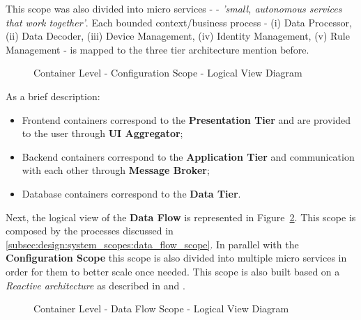 This scope was also divided into micro services - \cite{newman2021building} - \textit{'small, autonomous services that work together'}. Each bounded context/business process - (i) Data Processor, (ii) Data Decoder, (iii) Device Management, (iv) Identity Management, (v) Rule Management - is mapped to the three tier architecture mention before.

\begin{landscape}
   \begin{figure}[H]
      \centering
   \resizebox{\columnwidth}{!}
   {      
      
   }
   \caption[Container Level - Configuration Scope - Logical View Diagram]{Container Level - Configuration Scope - Logical View Diagram}
      \label{fig:design:architecture:container:logical:diagram:configuration}
   \end{figure}
\end{landscape}

As a brief description:

\begin{itemize}
   \item Frontend containers correspond to the \textbf{Presentation Tier} and are provided to the user through \textbf{UI Aggregator};
   \item Backend containers correspond to the \textbf{Application Tier} and communication with each other through \textbf{Message Broker};
   \item Database containers correspond to the \textbf{Data Tier}.
\end{itemize}

Next, the logical view of the \textbf{Data Flow} is represented in Figure~\ref{fig:design:architecture:container:logical:diagram:data_flow}. This scope is composed by the processes discussed in \ref{subsec:design:system_scopes:data_flow_scope}. In parallel with the \textbf{Configuration Scope} this scope is also divided into multiple micro services in order for them to better scale once needed. This scope is also built based on a \textit{Reactive architecture} as described in \cite{reactivemanifesto} and \cite{reactivesystem}.  

\begin{figure}[H]
   \centering
   \resizebox{\columnwidth}{!}
   {      
      
   }
   \caption[Container Level - Data Flow Scope - Logical View Diagram]{Container Level - Data Flow Scope - Logical View Diagram}
   \label{fig:design:architecture:container:logical:diagram:data_flow}
\end{figure}

